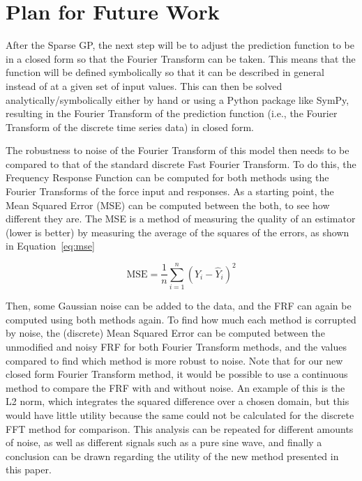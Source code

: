 \documentclass[12pt]{article}
\begin{document}
    \section{Plan for Future Work}
    After the Sparse GP, the next step will be to adjust the prediction function to be in a closed form so that the Fourier Transform can be taken.
    This means that the function will be defined symbolically so that it can be described in general instead of at a given set of input values.
    This can then be solved analytically/symbolically either by hand or using a Python package like SymPy, resulting in the Fourier Transform of the prediction function (i.e., the Fourier Transform of the discrete time series data) in closed form.

    The robustness to noise of the Fourier Transform of this model then needs to be compared to that of the standard discrete Fast Fourier Transform.
    To do this, the Frequency Response Function can be computed for both methods using the Fourier Transforms of the force input and responses.
    As a starting point, the Mean Squared Error (MSE) can be computed between the both, to see how different they are.
    The MSE is a method of measuring the quality of an estimator (lower is better) by measuring the average of the squares of the errors, as shown in Equation~\ref{eq:mse}

    \begin{equation}
        \text{MSE} = \frac{1}{n} \sum_{i=1}^{n} (Y_i - \hat{Y}_i)^2
        \label{eq:mse}
    \end{equation}


    Then, some Gaussian noise can be added to the data, and the FRF can again be computed using both methods again.
    To find how much each method is corrupted by noise, the (discrete) Mean Squared Error can be computed between the unmodified and noisy FRF for both Fourier Transform methods, and the values compared to find which method is more robust to noise.
    Note that for our new closed form Fourier Transform method, it would be possible to use a continuous method to compare the FRF with and without noise.
    An example of this is the L2 norm, which integrates the squared difference over a chosen domain, but this would have little utility because the same could not be calculated for the discrete FFT method for comparison.
    This analysis can be repeated for different amounts of noise, as well as different signals such as a pure sine wave, and finally a conclusion can be drawn regarding the utility of the new method presented in this paper.
\end{document}
